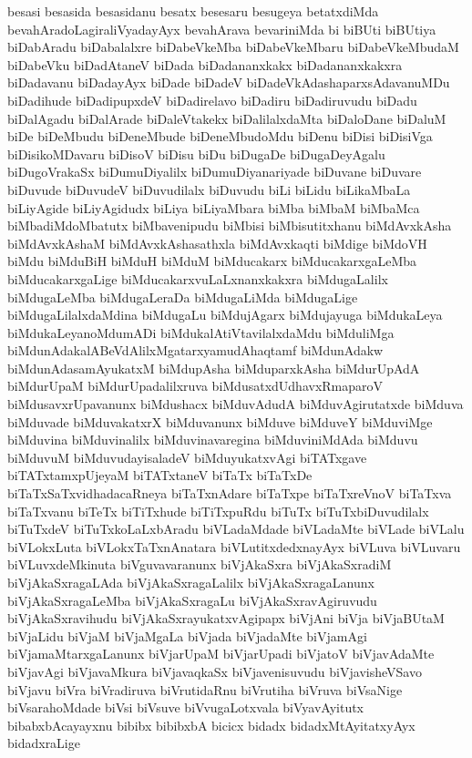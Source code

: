 {besasi
besasida
besasidanu
besatx
besesaru
besugeya
betatxdiMda
bevahAradoLagiraliVyadayAyx
bevahArava
bevariniMda
bi
biBUti
biBUtiya
biDabAradu
biDabalalxre
biDabeVkeMba
biDabeVkeMbaru
biDabeVkeMbudaM
biDabeVku
biDadAtaneV
biDada
biDadananxkakx
biDadananxkakxra
biDadavanu
biDadayAyx
biDade
biDadeV
biDadeVkAdashaparxsAdavanuMDu
biDadihude
biDadipupxdeV
biDadirelavo
biDadiru
biDadiruvudu
biDadu
biDalAgadu
biDalArade
biDaleVtakekx
biDalilalxdaMta
biDaloDane
biDaluM
biDe
biDeMbudu
biDeneMbude
biDeneMbudoMdu
biDenu
biDisi
biDisiVga
biDisikoMDavaru
biDisoV
biDisu
biDu
biDugaDe
biDugaDeyAgalu
biDugoVrakaSx
biDumuDiyalilx
biDumuDiyanariyade
biDuvane
biDuvare
biDuvude
biDuvudeV
biDuvudilalx
biDuvudu
biLi
biLidu
biLikaMbaLa
biLiyAgide
biLiyAgidudx
biLiya
biLiyaMbara
biMba
biMbaM
biMbaMca
biMbadiMdoMbatutx
biMbavenipudu
biMbisi
biMbisutitxhanu
biMdAvxkAsha
biMdAvxkAshaM
biMdAvxkAshasathxla
biMdAvxkaqti
biMdige
biMdoVH
biMdu
biMduBiH
biMduH
biMduM
biMducakarx
biMducakarxgaLeMba
biMducakarxgaLige
biMducakarxvuLaLxnanxkakxra
biMdugaLalilx
biMdugaLeMba
biMdugaLeraDa
biMdugaLiMda
biMdugaLige
biMdugaLilalxdaMdina
biMdugaLu
biMdujAgarx
biMdujayuga
biMdukaLeya
biMdukaLeyanoMdumADi
biMdukalAtiVtavilalxdaMdu
biMduliMga
biMdunAdakalABeVdAlilxMgatarxyamudAhaqtamf
biMdunAdakw
biMdunAdasamAyukatxM
biMdupAsha
biMduparxkAsha
biMdurUpAdA
biMdurUpaM
biMdurUpadalilxruva
biMdusatxdUdhavxRmaparoV
biMdusavxrUpavanunx
biMdushacx
biMduvAdudA
biMduvAgirutatxde
biMduva
biMduvade
biMduvakatxrX
biMduvanunx
biMduve
biMduveY
biMduviMge
biMduvina
biMduvinalilx
biMduvinavaregina
biMduviniMdAda
biMduvu
biMduvuM
biMduvudayisaladeV
biMduyukatxvAgi
biTATxgave
biTATxtamxpUjeyaM
biTATxtaneV
biTaTx
biTaTxDe
biTaTxSaTxvidhadacaRneya
biTaTxnAdare
biTaTxpe
biTaTxreVnoV
biTaTxva
biTaTxvanu
biTeTx
biTiTxhude
biTiTxpuRdu
biTuTx
biTuTxbiDuvudilalx
biTuTxdeV
biTuTxkoLaLxbAradu
biVLadaMdade
biVLadaMte
biVLade
biVLalu
biVLokxLuta
biVLokxTaTxnAnatara
biVLutitxdedxnayAyx
biVLuva
biVLuvaru
biVLuvxdeMkinuta
biVguvavaranunx
biVjAkaSxra
biVjAkaSxradiM
biVjAkaSxragaLAda
biVjAkaSxragaLalilx
biVjAkaSxragaLanunx
biVjAkaSxragaLeMba
biVjAkaSxragaLu
biVjAkaSxravAgiruvudu
biVjAkaSxravihudu
biVjAkaSxrayukatxvAgipapx
biVjAni
biVja
biVjaBUtaM
biVjaLidu
biVjaM
biVjaMgaLa
biVjada
biVjadaMte
biVjamAgi
biVjamaMtarxgaLanunx
biVjarUpaM
biVjarUpadi
biVjatoV
biVjavAdaMte
biVjavAgi
biVjavaMkura
biVjavaqkaSx
biVjavenisuvudu
biVjavisheVSavo
biVjavu
biVra
biVradiruva
biVrutidaRnu
biVrutiha
biVruva
biVsaNige
biVsarahoMdade
biVsi
biVsuve
biVvugaLotxvala
biVyavAyitutx
bibabxbAcayayxnu
bibibx
bibibxbA
bicicx
bidadx
bidadxMtAyitatxyAyx
bidadxraLige
}
